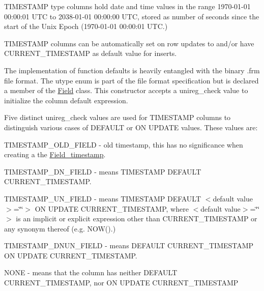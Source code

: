 T\+I\+M\+E\+S\+T\+A\+MP type columns hold date and time values in the range 1970-\/01-\/01 00\+:00\+:01 U\+TC to 2038-\/01-\/01 00\+:00\+:00 U\+TC, stored as number of seconds since the start of the Unix Epoch (1970-\/01-\/01 00\+:00\+:01 U\+TC.)

T\+I\+M\+E\+S\+T\+A\+MP columns can be automatically set on row updates to and/or have C\+U\+R\+R\+E\+N\+T\+\_\+\+T\+I\+M\+E\+S\+T\+A\+MP as default value for inserts.

The implementation of function defaults is heavily entangled with the binary .frm file format. The {\ttfamily utype} {\ttfamily enum} is part of the file format specification but is declared a member of the \mbox{\hyperlink{classField}{Field}} class. This constructor accepts a unireg\+\_\+check value to initialize the column default expression.

Five distinct unireg\+\_\+check values are used for T\+I\+M\+E\+S\+T\+A\+MP columns to distinguish various cases of D\+E\+F\+A\+U\+LT or ON U\+P\+D\+A\+TE values. These values are\+:


\begin{DoxyItemize}
\item T\+I\+M\+E\+S\+T\+A\+M\+P\+\_\+\+O\+L\+D\+\_\+\+F\+I\+E\+LD -\/ old timestamp, this has no significance when creating a the \mbox{\hyperlink{classField__timestamp}{Field\+\_\+timestamp}}.
\item T\+I\+M\+E\+S\+T\+A\+M\+P\+\_\+\+D\+N\+\_\+\+F\+I\+E\+LD -\/ means T\+I\+M\+E\+S\+T\+A\+MP D\+E\+F\+A\+U\+LT C\+U\+R\+R\+E\+N\+T\+\_\+\+T\+I\+M\+E\+S\+T\+A\+MP.
\item T\+I\+M\+E\+S\+T\+A\+M\+P\+\_\+\+U\+N\+\_\+\+F\+I\+E\+LD -\/ means T\+I\+M\+E\+S\+T\+A\+MP D\+E\+F\+A\+U\+LT $<$default value$>$=\char`\"{}\char`\"{}$>$ ON U\+P\+D\+A\+TE C\+U\+R\+R\+E\+N\+T\+\_\+\+T\+I\+M\+E\+S\+T\+A\+MP, where $<$default value$>$=\char`\"{}\char`\"{}$>$ is an implicit or explicit expression other than C\+U\+R\+R\+E\+N\+T\+\_\+\+T\+I\+M\+E\+S\+T\+A\+MP or any synonym thereof (e.\+g. N\+O\+W().)
\item T\+I\+M\+E\+S\+T\+A\+M\+P\+\_\+\+D\+N\+U\+N\+\_\+\+F\+I\+E\+LD -\/ means D\+E\+F\+A\+U\+LT C\+U\+R\+R\+E\+N\+T\+\_\+\+T\+I\+M\+E\+S\+T\+A\+MP ON U\+P\+D\+A\+TE C\+U\+R\+R\+E\+N\+T\+\_\+\+T\+I\+M\+E\+S\+T\+A\+MP.
\item N\+O\+NE -\/ means that the column has neither D\+E\+F\+A\+U\+LT C\+U\+R\+R\+E\+N\+T\+\_\+\+T\+I\+M\+E\+S\+T\+A\+MP, nor ON U\+P\+D\+A\+TE C\+U\+R\+R\+E\+N\+T\+\_\+\+T\+I\+M\+E\+S\+T\+A\+MP
\end{DoxyItemize}

